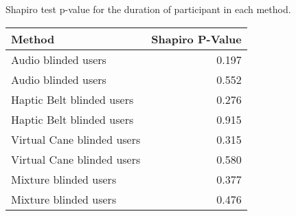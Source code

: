 
\centering
\caption{Shapiro test p-value for the duration of participant in each method.}
\label{tab:shapiro_duration}
\begin{tabular}{lr}
\toprule
                    Method &  Shapiro P-Value \\
\midrule
       Audio blinded users &            0.197 \\
       Audio blinded users &            0.552 \\
 Haptic Belt blinded users &            0.276 \\
 Haptic Belt blinded users &            0.915 \\
Virtual Cane blinded users &            0.315 \\
Virtual Cane blinded users &            0.580 \\
     Mixture blinded users &            0.377 \\
     Mixture blinded users &            0.476 \\
\bottomrule
\end{tabular}
